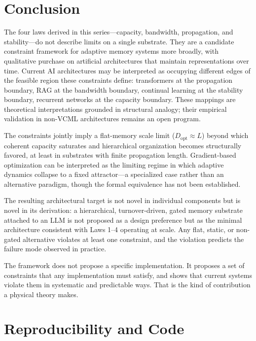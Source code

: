 \documentclass[12pt]{article}
\begin{document}
\section{Conclusion}
\label{sec:conclusion}

The four laws derived in this series---capacity, bandwidth, propagation, and stability---do not describe limits on a single substrate. They are a candidate constraint framework for adaptive memory systems more broadly, with qualitative purchase on artificial architectures that maintain representations over time. Current AI architectures may be interpreted as occupying different edges of the feasible region these constraints define: transformers at the propagation boundary, RAG at the bandwidth boundary, continual learning at the stability boundary, recurrent networks at the capacity boundary. These mappings are theoretical interpretations grounded in structural analogy; their empirical validation in non-VCML architectures remains an open program.

The constraints jointly imply a flat-memory scale limit ($D_{\text{opt}} \approx L$) beyond which coherent capacity saturates and hierarchical organization becomes structurally favored, at least in substrates with finite propagation length. Gradient-based optimization can be interpreted as the limiting regime in which adaptive dynamics collapse to a fixed attractor---a specialized case rather than an alternative paradigm, though the formal equivalence has not been established.

The resulting architectural target is not novel in individual components but is novel in its derivation: a hierarchical, turnover-driven, gated memory substrate attached to an LLM is not proposed as a design preference but as the minimal architecture consistent with Laws 1--4 operating at scale. Any flat, static, or non-gated alternative violates at least one constraint, and the violation predicts the failure mode observed in practice.

The framework does not propose a specific implementation. It proposes a set of constraints that any implementation must satisfy, and shows that current systems violate them in systematic and predictable ways. That is the kind of contribution a physical theory makes.

\appendix
\section{Reproducibility and Code}
\label{app:code}
\end{document}
